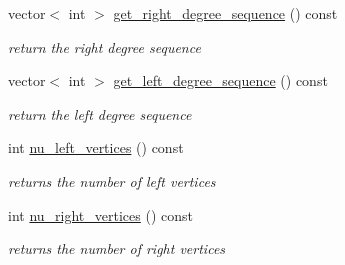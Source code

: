 \begin{DoxyCompactItemize}
vector$<$ int $>$ \hyperlink{classb__graph_a2711566385b92b02f4c03abdc1f9a582}{get\+\_\+right\+\_\+degree\+\_\+sequence} () const
\begin{DoxyCompactList}\small\item\em return the right degree sequence \end{DoxyCompactList}\item 
vector$<$ int $>$ \hyperlink{classb__graph_afd65fb655f7e24217393a10533b87d3c}{get\+\_\+left\+\_\+degree\+\_\+sequence} () const
\begin{DoxyCompactList}\small\item\em return the left degree sequence \end{DoxyCompactList}\item 
int \hyperlink{classb__graph_a5e71d5c97f2501b0b93c17146cf7e68e}{nu\+\_\+left\+\_\+vertices} () const
\begin{DoxyCompactList}\small\item\em returns the number of left vertices \end{DoxyCompactList}\item 
int \hyperlink{classb__graph_abecfd7d6fbd0d9a554fe0d9aa3241a04}{nu\+\_\+right\+\_\+vertices} () const
\begin{DoxyCompactList}\small\item\em returns the number of right vertices \end{DoxyCompactList}\end{DoxyCompactItemize}
